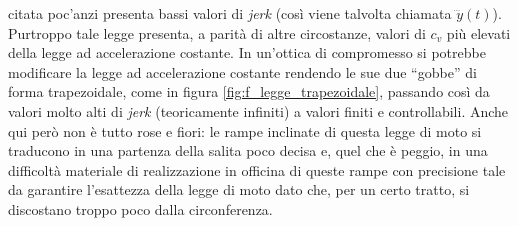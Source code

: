 citata poc'anzi presenta bassi valori di {\em jerk} (cos\`i viene
talvolta chiamata $\dddot{y}(t)$). Purtroppo tale legge presenta, a parit\`a di
altre circostanze, valori di $c_v$ pi\`u elevati della legge ad
accelerazione costante.
\noindent In un'ottica di compromesso si potrebbe modificare la legge ad accelerazione costante rendendo le sue due ``gobbe'' di forma trapezoidale, come in figura 
\ref{fig:f_legge_trapezoidale},  passando
cos\`i da valori molto alti di {\em jerk} (teoricamente infiniti) a valori finiti
e controllabili.
Anche qui per\`o non \`e tutto rose e fiori: le rampe inclinate di questa legge di moto
si traducono in una partenza della salita poco decisa e, quel che \`e peggio,
in una difficolt\`a materiale di realizzazione in officina di queste rampe con
precisione tale da garantire l'esattezza della legge di moto
dato che, per un certo tratto, si discostano troppo poco dalla circonferenza.

